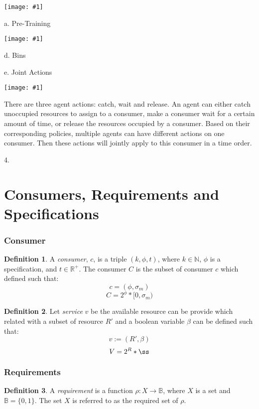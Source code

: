 \documentclass{article}
\theoremstyle{definition}
\newtheorem{definition}{Definition}[section]
\theoremstyle{remark}
\newcommand{\reqfunc}[2]{#1:#2\rightarrow\mathbb{B}}
\newcommand{\addpic}[1]{\texttt{[image: \#1]}}
\begin{document}
	
	\addpic{Training2.jpg}
	
	
	a. Pre-Training
	
	\addpic{Pre-Train.jpg}

	
	
	
	d. Bins
	
	e. Joint Actions
	
	\addpic{Joint-action.jpg}
	
	There are three agent actions: catch, wait and release. An agent can either catch unoccupied resources to assign to a consumer, make a consumer wait for a certain amount of time, or release the resources occupied by a consumer. Based on their corresponding policies, multiple agents can have different actions on one consumer. Then these actions will jointly apply to this consumer in a time order.
		
	4.
	
	\newpage
	
	\part{Consumers, Requirements and Specifications}
	
	\section{Consumer}
	
		\begin{definition}
			A \emph{consumer}, $c$, is a triple $(k, \phi, t)$, where $k \in \mathbb{N}$, $\phi$ is a specification, and $t \in \mathbb{R}^{+}$. The consumer $C$ is the subset of consumer $c$ which defined such that:
			\[
			c = (\phi , \sigma_m)
			\]
			\[
			C = 2^{\phi}*[0,\sigma_m)
			\]
		\end{definition}
		
		\begin{definition}
			Let \emph{service} $v$ be the available resource can be provide which related with a subset of resource $R'$ and a boolean variable $\beta$ can be defined such that:
			\[
			v := (R', \beta)
			\]
			\[
			V = 2^{R}*{\ss}
			\]
		\end{definition}
	
	\section{Requirements}
	
		\begin{definition}
			A \emph{requirement} is a function $\reqfunc{\rho}{X}$, where $X$ is a set and $\mathbb{B} = \{0,1\}$. The set $X$ is referred to as the required set of $\rho$.
		\end{definition}
		
\end{document}
